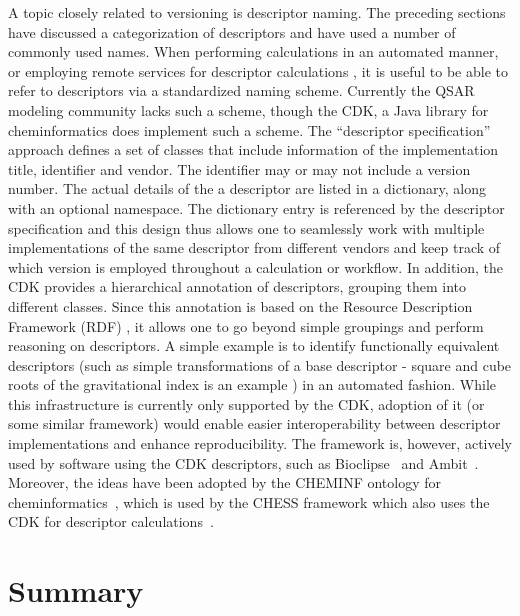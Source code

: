 \documentclass[letterpaper, 12pt]{article}
\begin{document}
A topic closely related to versioning is descriptor naming. The
preceding sections have discussed a categorization of descriptors and
have used a number of commonly used names. When performing
calculations in an automated manner, or employing remote services for
descriptor calculations \cite{Dong:2007aa}, it is useful to be able to
refer to descriptors via a standardized naming scheme. Currently the
QSAR modeling community lacks such a scheme, though the CDK, a Java
library for cheminformatics \cite{Steinbeck:2006aa} does implement
such a scheme. The ``descriptor specification'' approach defines a set
of classes that include information of the implementation title,
identifier and vendor. The identifier may or may not include a version
number. The actual details of the a descriptor are listed in a
dictionary, along with an optional namespace. The dictionary entry is
referenced by the descriptor specification and this design thus allows
one to seamlessly work with multiple implementations of the same
descriptor from different vendors and keep track of which version is
employed throughout a calculation or workflow. In addition, the CDK
provides a hierarchical annotation of descriptors, grouping them into
different classes. Since this annotation is based on the Resource
Description Framework (RDF) \cite{Taylor:2006ab}, it allows one to go
beyond simple groupings and perform reasoning on descriptors. A simple
example is to identify functionally equivalent descriptors (such as
simple transformations of a base descriptor - square and cube roots of
the gravitational index is an example \cite{Wessel:1998ve}) in an
automated fashion. While this infrastructure is currently only
supported by the CDK, adoption of it (or some similar framework) would
enable easier interoperability between descriptor implementations and
enhance reproducibility. The framework is, however, actively used by
software using the CDK descriptors, such as
Bioclipse~\cite{Spjuth2010} and Ambit~\cite{Jelizakova2011}. Moreover,
the ideas have been adopted by the CHEMINF ontology for
cheminformatics~\cite{Hastings2011}, which is used by the CHESS
framework which also uses the CDK for descriptor
calculations~\cite{Chepelev2011b}.


\section{Summary}
\label{sec:summary}
\end{document}
